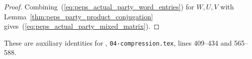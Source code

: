 \begin{proof}\leanok
    Combining~(\ref{eq:peps_actual_party_word_entries}) for $W,U,V$ with Lemma~\ref{thm:peps_party_product_conjugation} gives~(\ref{eq:peps_actual_party_mixed_matrix}).
\end{proof}

These are auxiliary identities for
\cite[proof of Theorem~5.2]{OpenAI2026PolynomialPEPS},
\texttt{04-compression.tex}, lines 409--434 and 565--588.

